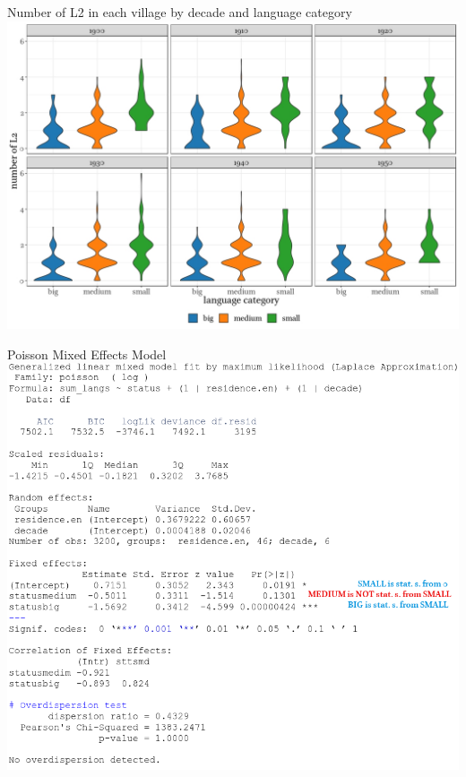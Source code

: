 \documentclass[13pt, t]{beamer}
\begin{document}

\begin{frame}{Number of L2 in each village by decade and language category}
\hspace{-0.9cm}\includegraphics[width=1.08\linewidth]{images/12_panel_1100_750}
\end{frame}

\begin{frame}{Poisson Mixed Effects Model}
\includegraphics[width=0.87\linewidth]{images/13_poisson}
\end{frame}
\end{document}

